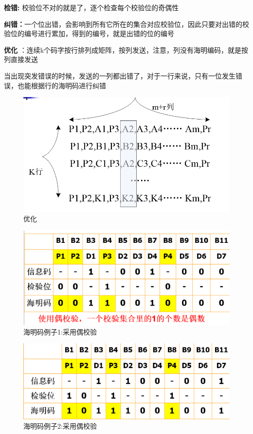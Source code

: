 \documentclass[UTF8,a4paper]{ctexart}
\begin{document}
  \textbf{检错:} 校验位不对的就是了，逐个检查每个校验位的奇偶性

  \textbf{纠错：}一个位出错，会影响到所有它所在的集合对应校验位，因此只要对出错的校验位的编号进行累加，得到的编号，就是出错的位的编号

  \textbf{优化} ：连续k个码字按行排列成矩阵，按列发送，注意，列没有海明编码，就是按列直接发送

  当出现突发错误的时候，发送的一列都出错了，对于一行来说，只有一位发生错误，也能根据行的海明码进行纠错
  \begin{figure}[H]
    \centering
    \includegraphics[scale = 0.3]{assets/jisuanjiwangluo_55419.png}
    \caption{优化}
  \end{figure}

  \begin{figure}[H]
    \centering
    \includegraphics[scale = 0.3]{assets/jisuanjiwangluo_b5d1f.png}
    \caption{海明码例子1:采用偶校验}
  \end{figure}

  \begin{figure}[H]
    \centering
    \includegraphics[scale = 0.3]{assets/jisuanjiwangluo_0f780.png}
    \caption{海明码例子2:采用偶校验}
  \end{figure}
\end{document}
